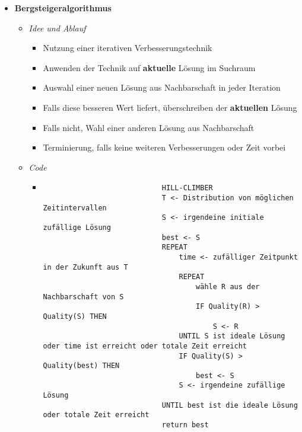 \begin{itemize}
        \item \textbf{Bergsteigeralgorithmus}
            \begin{itemize}
                \item \textit{Idee und Ablauf}
                    \begin{itemize}
                        \item Nutzung einer iterativen Verbesserungstechnik
                        \item Anwenden der Technik auf \textbf{aktuelle} Lösung im Suchraum
                        \item Auswahl einer neuen Lösung aus Nachbarschaft in jeder Iteration
                        \item Falls diese besseren Wert liefert, überschreiben der \textbf{aktuellen} Lösung
                        \item Falls nicht, Wahl einer anderen Lösung aus Nachbarschaft
                        \item Terminierung, falls keine weiteren Verbesserungen oder Zeit vorbei
                    \end{itemize}
                \item \textit{Code}
                    \begin{itemize}
                        \item[]
                            \begin{verbatim}
                            HILL-CLIMBER
                            T <- Distribution von möglichen Zeitintervallen
                            S <- irgendeine initiale zufällige Lösung
                            best <- S
                            REPEAT
                                time <- zufälliger Zeitpunkt in der Zukunft aus T
                                REPEAT
                                    wähle R aus der Nachbarschaft von S
                                    IF Quality(R) > Quality(S) THEN
                                        S <- R
                                UNTIL S ist ideale Lösung oder time ist erreicht oder totale Zeit erreicht
                                IF Quality(S) > Quality(best) THEN
                                    best <- S
                                S <- irgendeine zufällige Lösung
                            UNTIL best ist die ideale Lösung oder totale Zeit erreicht
                            return best
                            \end{verbatim}
                    \end{itemize}

\end{itemize}
\end{itemize}
